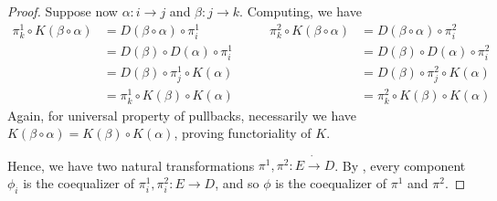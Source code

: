\documentclass[runningheads,envcountsect]{lipics-v2021}
\newcommand{\cat}[1]{\ensuremath{\mathbf{#1}}}
\begin{document}
\begin{proof}
        Suppose now $\alpha : i \to j$ and $\beta: j \to k$. Computing, we have
        \[
            \begin{split}
                \pi_k^1 \circ K(\beta \circ \alpha) &= D(\beta \circ \alpha) \circ \pi_i^1 \\
                                                    &= D(\beta) \circ D(\alpha) \circ \pi_i^1 \\
                                                    &= D(\beta) \circ \pi_j^1 \circ K(\alpha) \\
                                                    &= \pi_k^1 \circ K(\beta) \circ K(\alpha)
            \end{split} \qquad
            \begin{split}
                \pi_k^2 \circ K(\beta \circ \alpha) &= D(\beta \circ \alpha) \circ \pi_i^2 \\
                                                    &= D(\beta) \circ D(\alpha) \circ \pi_i^2 \\
                                                    &= D(\beta) \circ \pi_j^2 \circ K(\alpha) \\
                                                    &= \pi_k^2 \circ K(\beta) \circ K(\alpha)
            \end{split}
        \]
        Again, for universal property of pullbacks, necessarily we have $K(\beta \circ \alpha) = K(\beta) \circ K(\alpha)$, proving functoriality of $K$.
   
    
     Hence, we have two natural transformations $\pi^1, \pi^2 : E \dot\to D$. By , every component $\phi_i$ is the coequalizer of $\pi_i^1, \pi_i^2: E \to D$, and so $\phi$ is the coequalizer of $\pi^1$ and $\pi^2$.   
\end{proof}

\end{document}
